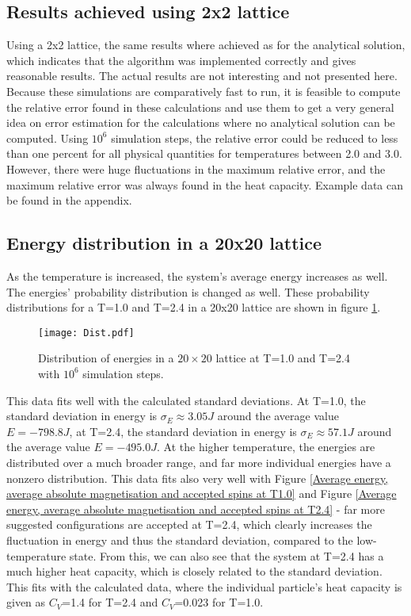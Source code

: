 \documentclass[10pt,a4paper]{article}
\begin{document}
\subsection{Results achieved using 2x2 lattice}
Using a 2x2 lattice, the same results where achieved as for the analytical solution, which indicates that the algorithm was implemented correctly and gives reasonable results. The actual results are not interesting and not presented here. Because these simulations are comparatively fast to run, it is feasible to compute the relative error found in these calculations and use them to get a very general idea on error estimation for the calculations where no analytical solution can be computed.
Using $10^6$ simulation steps, the relative error could be reduced to less than one percent for all physical quantities for temperatures between 2.0 and 3.0. However, there were huge fluctuations in the maximum relative error, and the maximum relative error was always found in the heat capacity. Example data can be found in the appendix.
\subsection{Energy distribution in a 20x20 lattice}
As the temperature is increased, the system's average energy increases as well. The energies' probability distribution is changed as well. These probability distributions for a T=1.0 and T=2.4 in a 20x20 lattice are shown in figure \ref{Energy probability distributions in a 20x20 lattice at T1.0  T2.4}.
\begin{figure}[H]
\texttt{[image: Dist.pdf]}
\caption[Energy probability distributions in a 20x20 lattice at T=1.0 \& T=2.4]{Distribution of energies in a $20\times20$ lattice at T=1.0 and T=2.4 with $10^6$ simulation steps.}\label{Energy probability distributions in a 20x20 lattice at T1.0  T2.4}
\end{figure}
This data fits well with the calculated standard deviations. At T=1.0, the standard deviation in energy is $\sigma_E\approx3.05J$ around the average value $E=-798.8J$, at T=2.4, the standard deviation in energy is $\sigma_E\approx57.1J$ around the average value $E=-495.0J$. At the higher temperature, the energies are distributed over a much broader range, and far more individual energies have a nonzero distribution. This data fits also very well with Figure \ref{Average energy, average absolute magnetisation and accepted spins at T1.0} and Figure \ref{Average energy, average absolute magnetisation and accepted spins at T2.4} - far more suggested configurations are accepted at T=2.4, which clearly increases the fluctuation in energy and thus the standard deviation, compared to the low-temperature state. From this, we can also see that the system at T=2.4 has a much higher heat capacity, which is closely related to the standard deviation. This fits with the calculated data, where the individual particle's heat capacity is given as $C_V$=1.4 for T=2.4 and $C_V$=0.023 for T=1.0. 
\end{document}
